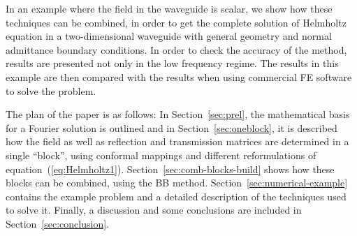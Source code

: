 \documentclass[numreferences]{kluwer}
\renewcommand{\phi}{\varphi}
\begin{document}
In an example where the field in the waveguide is scalar, we show how
these techniques can be combined, in order to get the complete
solution of Helmholtz equation in a two-dimensional waveguide with
general geometry and normal admittance boundary conditions. In order
to check the accuracy of the method, results are presented not only in
the low frequency regime.  The results in this example are then
compared with the results when using commercial FE software to solve
the problem.

The plan of the paper is as follows: In Section~\ref{sec:prel}, the
mathematical basis for a Fourier solution is outlined and in
Section~\ref{sec:oneblock}, it is described how the field as well as
reflection and transmission matrices are determined in a single
``block'', using conformal mappings and different reformulations of
equation~(\ref{eq:Helmholtz1}).  Section~\ref{sec:comb-blocks-build}
shows how these blocks can be combined, using the BB
method. Section~\ref{sec:numerical-example} contains the example
problem and a detailed description of the techniques used to solve
it. Finally, a discussion and some conclusions are included in
Section~\ref{sec:conclusion}.


\end{document}
